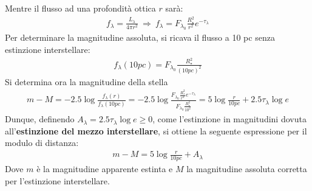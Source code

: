 \documentclass[a4paper, oneside]{book}
\begin{document}
Mentre il flusso ad una profondità ottica $r$ sarà:
\begin{gather*}
    f_\lambda = \frac{L_\lambda}{4\pi r^{2}} \ \Longrightarrow \ f_\lambda = F_{\lambda_0} \frac{R_\star^{2}}{r^{2}}e^{-\tau_\lambda}
\end{gather*}
Per determinare la magnitudine assoluta, si ricava il flusso a 10 pc senza estinzione interstellare:
\begin{gather*}
    f_\lambda (10 pc) = F_{\lambda_0} \frac{R_\star^{2}}{(10 pc)^{2}}
\end{gather*}
Si determina ora la magnitudine della stella 
\begin{gather*}
    m - M = -2.5 \log \frac{f_\lambda(r)}{f_\lambda(10 pc)} = -2.5\log\frac{F_{\lambda_0} \frac{R_\star^{2}}{r^{2}}e^{-\tau_\lambda}}{F_{\lambda_0} \frac{R_\star^{2}}{10^{2}}} = 5 \log \frac{r}{10 pc} + 2.5 \tau_\lambda \log e
\end{gather*}
Dunque, definendo $A_\lambda = 2.5 \tau_\lambda \log e \geq 0$, come l'estinzione in magnitudini 
dovuta all'\textbf{estinzione del mezzo interstellare}, si ottiene la seguente espressione
per il modulo di distanza:
\begin{align}
    m - M = 5\log \frac{r}{10 pc } + A_\lambda
\end{align} 
Dove $m$ è la magnitudine apparente estinta e $M$ la magnitudine assoluta corretta per l'estinzione 
interstellare.
\end{document}
